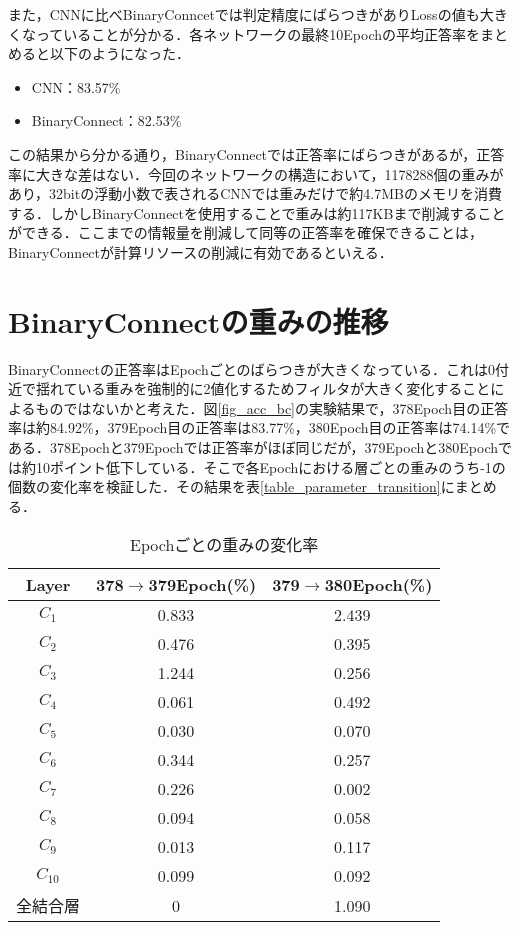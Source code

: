 また，CNNに比べBinaryConncetでは判定精度にばらつきがありLossの値も大きくなっていることが分かる．各ネットワークの最終10Epochの平均正答率をまとめると以下のようになった．
\begin{itemize}
  \item CNN：83.57\%
  \item BinaryConnect：82.53\%
\end{itemize}

この結果から分かる通り，BinaryConnectでは正答率にばらつきがあるが，正答率に大きな差はない．今回のネットワークの構造において，1178288個の重みがあり，32bitの浮動小数で表されるCNNでは重みだけで約4.7MBのメモリを消費する．しかしBinaryConnectを使用することで重みは約117KBまで削減することができる．ここまでの情報量を削減して同等の正答率を確保できることは，BinaryConnectが計算リソースの削減に有効であるといえる．

\section{BinaryConnectの重みの推移}
BinaryConnectの正答率はEpochごとのばらつきが大きくなっている．これは0付近で揺れている重みを強制的に2値化するためフィルタが大きく変化することによるものではないかと考えた．図\ref{fig_acc_bc}の実験結果で，378Epoch目の正答率は約84.92\%，379Epoch目の正答率は83.77\%，380Epoch目の正答率は74.14\%である．378Epochと379Epochでは正答率がほぼ同じだが，379Epochと380Epochでは約10ポイント低下している．そこで各Epochにおける層ごとの重みのうち-1の個数の変化率を検証した．その結果を表\ref{table_parameter_transition}にまとめる．
\begin{table}[htbp]
  \caption{Epochごとの重みの変化率}
  \label{table_parameter_transition}
  \centering
  \begin{tabular}{ccc}
    \hline
    Layer & 378$\to$379Epoch(\%) & 379$\to$380Epoch(\%) \\
    \hline \hline
    $C_1$ & 0.833 & 2.439\\
    $C_2$ & 0.476 & 0.395\\
    $C_3$ & 1.244 & 0.256\\
    $C_4$ & 0.061 & 0.492\\
    $C_5$ & 0.030 & 0.070\\
    $C_6$ & 0.344 & 0.257\\
    $C_7$ & 0.226 & 0.002\\
    $C_8$ & 0.094 & 0.058\\
    $C_9$ & 0.013 & 0.117\\
    $C_{10}$ & 0.099 & 0.092\\
    全結合層 & 0 & 1.090\\
    \hline
  \end{tabular}
  \label{table_omomisuii}
\end{table}

